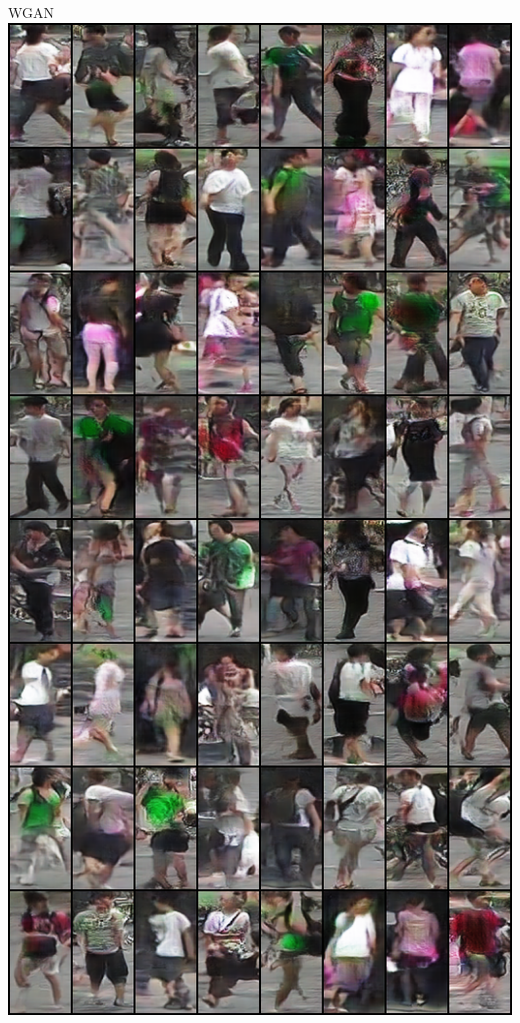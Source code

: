 \documentclass[usenames,dvipsnames,notes]{beamer}
\begin{document}
\begin{frame}
{WGAN}
\includegraphics[height=\textheight]{wgan0.png}

\end{frame}
\end{document}
